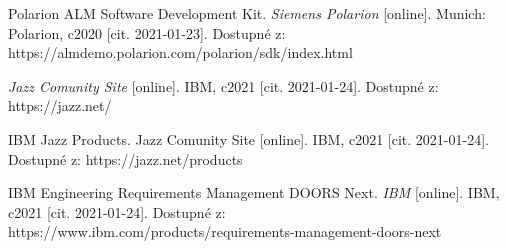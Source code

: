 \documentclass[czech,master,public,dept460,male,cpdeclaration,oneside]{diploma}
\begin{document}
\begin{thebibliography}{37}
Polarion ALM Software Development Kit. \textit{Siemens Polarion} [online]. Munich: Polarion, c2020 [cit. 2021-01-23]. Dostupné z: https://almdemo.polarion.com/polarion/sdk/index.html

\textit{Jazz Comunity Site} [online]. IBM, c2021 [cit. 2021-01-24]. Dostupné z: https://jazz.net/

IBM Jazz Products. Jazz Comunity Site [online]. IBM, c2021 [cit. 2021-01-24]. Dostupné z: https://jazz.net/products

IBM Engineering Requirements Management DOORS Next. \textit{IBM} [online]. IBM, c2021 [cit. 2021-01-24]. Dostupné z: https://www.ibm.com/products/requirements-management-doors-next

\end{thebibliography}
\end{document}

